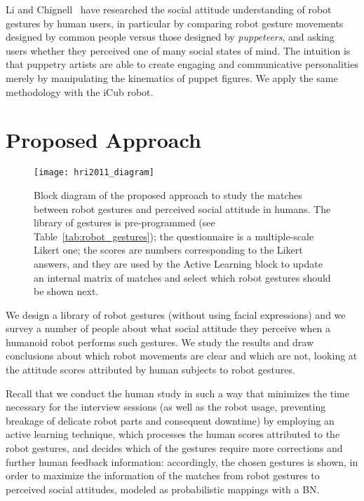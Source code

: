 Li and Chignell~\cite{li:2011:ijsr} have researched the social attitude understanding of robot gestures by human users, in particular by comparing robot gesture movements designed by common people versus those designed by \emph{puppeteers}, and asking users whether they perceived one of many social states of mind. The intuition is that puppetry artists are able to create engaging and communicative personalities merely by manipulating the kinematics of puppet figures. We apply the same methodology with the iCub robot.

\section{Proposed Approach}
\label{sec:human_perc_robotgest:approach}

\begin{figure}
\centering
\texttt{[image: hri2011\_diagram]}
\caption[Block diagram of the proposed approach to study the matches between robot gestures and perceived social attitude in humans.]{Block diagram of the proposed approach to study the matches between robot gestures and perceived social attitude in humans. The library of gestures is pre-programmed (see Table~\ref{tab:robot_gestures}); the questionnaire is a multiple-scale Likert one; the scores are numbers corresponding to the Likert answers, and they are used by the Active Learning block to update an internal matrix of matches and select which robot gestures should be shown next.}
\label{fig:human_perc_robotgest:diagram}
\end{figure}

We design a library of robot gestures (without using facial expressions) and we survey a number of people about what social attitude they perceive when a humanoid robot performs such gestures. We study the results and draw conclusions about which robot movements are clear and which are not, looking at the attitude scores attributed by human subjects to robot gestures.

Recall that we conduct the human study in such a way that minimizes the time necessary for the interview sessions (as well as the robot usage, preventing breakage of delicate robot parts and consequent downtime) by employing an active learning technique, which processes the human scores attributed to the robot gestures, and decides which of the gestures require more corrections and further human feedback information: accordingly, the chosen gestures is shown, in order to maximize the information of the matches from robot gestures to perceived social attitudes, modeled as probabilistic mappings with a \acl{BN}.

